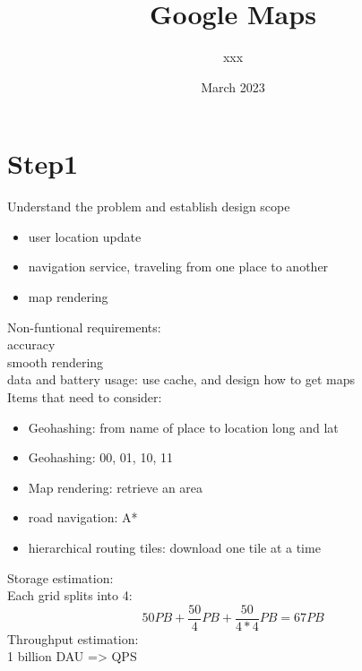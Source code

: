 \documentclass{article}
\title{Google Maps}
\author{xxx}
\date{March 2023}
\begin{document}
\maketitle

\section{Step1}
Understand the problem and establish design scope\\
\begin{itemize}
    \item user location update
    \item navigation service, traveling from one place to another
    \item map rendering
\end{itemize}
Non-funtional requirements:\\
accuracy\\
smooth rendering\\
data and battery usage: use cache, and design how to get maps\\
Items that need to consider:\\
\begin{itemize}
    \item Geohashing: from name of place to location long and lat\\
    \item Geohashing: 00, 01, 10, 11\\
    \item Map rendering: retrieve an area\\
    \item road navigation: A*\\
    \item hierarchical routing tiles: download one tile at a time\\
\end{itemize}
Storage estimation:\\
Each grid splits into 4:\\
\begin{equation}
   50PB + \frac{50}{4}PB+\frac{50}{4*4}PB = 67PB 
\end{equation}
Throughput estimation:\\
1 billion DAU => QPS\\
\end{document}
